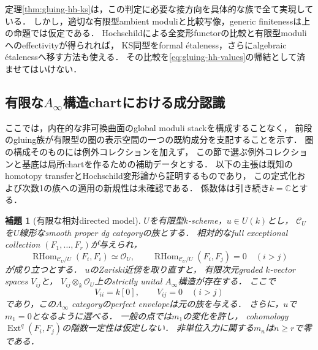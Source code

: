 \documentclass[11pt,a4paper]{ltjsarticle}
\newtheorem{lemma}[theorem]{補題}
\theoremstyle{definition}
\newcommand{\OO}{\mathcal O}
\newcommand{\RHom}{\operatorname{RHom}}
\newcommand{\Ext}{\operatorname{Ext}}
\begin{document}
定理\ref{thm:gluing-hh-ks}は，この判定に必要な接方向を具体的な族で全て実現している．
しかし，適切な有限型ambient moduliと比較写像，generic finitenessは上の命題では仮定である．
Hochschildによる全変形functorの比較と有限型moduliへのeffectivityが得られれば，
KS同型をformal étaleness，さらにalgebraic étalenessへ移す方法も使える．
その比較を\eqref{eq:gluing-hh-values}の帰結として済ませてはいけない．

\subsection{有限な$A_\infty$構造chartにおける成分認識}
\label{sec:finite-directed-chart}

ここでは，内在的な非可換曲面のglobal moduli stackを構成することなく，
前段のgluing族が有限型の圏の表示空間の一つの既約成分を支配することを示す．
圏の構成そのものには例外コレクションを加えず，
この節で選ぶ例外コレクションと基底は局所chartを作るための補助データとする．
以下の主張は既知のhomotopy transferとHochschild変形論から証明するものであり，
この定式化および次数1の族への適用の新規性は未確認である．
係数体は引き続き$k=\mathbb C$とする．

\begin{lemma}[有限な相対directed model]
\label{lem:relative-directed-model}
$U$を有限型$k$-scheme，$u\in U(k)$とし，
$\mathcal C_U$を$U$線形なsmooth proper dg categoryの族とする．
相対的なfull exceptional collection
$(F_1,\ldots,F_r)$が与えられ，
\[
 \RHom_{\mathcal C_U/U}(F_i,F_i)\simeq\OO_U,\qquad
 \RHom_{\mathcal C_U/U}(F_i,F_j)=0\quad(i>j)
\]
が成り立つとする．
$u$のZariski近傍を取り直すと，
有限次元graded $k$-vector spaces $V_{ij}$と，
$V_{ij}\otimes_k\OO_U$上のstrictly unital $A_\infty$構造が存在する．
ここで
\[
 V_{ii}=k[0],\qquad V_{ij}=0\quad(i>j)
\]
であり，この$A_\infty$ categoryのperfect envelopeは元の族を与える．
さらに，$u$で$m_1=0$となるように選べる．
一般の点では$m_1$の変化を許し，
cohomology $\Ext^q(F_i,F_j)$の階数一定性は仮定しない．
非単位入力に関する$m_n$は$n\geq r$で零である．
\end{lemma}
\end{document}
